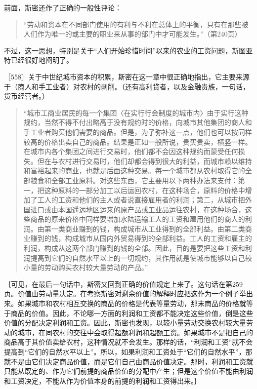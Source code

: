 前面，斯密还作了正确的一般性评论：

\begin{quote}{“劳动和资本在不同部门使用的有利与不利在总体上的平衡，只有在那些被人们作为唯一的或主要的职业来从事的部门中才可能发生。”（第240页）}\end{quote}

不过，这一思想，特别是关于“人们开始珍惜时间”以来的农业的工资问题，斯图亚特已经很好地阐明了。

［558］关于中世纪城市资本的积累，斯密在这一章中很正确地指出，它主要来源于（商人和手工业者）对农村的剥削。（还有高利贷者，以及金融贵族，一句话，货币经营者。）

\begin{quote}{“城市工商业居民的每一个集团〈在实行行会制度的城市内〉由于实行这种规约，当然不得不付出略高于没有规约时的价格，向城市其他集团的商人和手工业者购买他们需要的商品。但是，为了弥补这一点，他们也可以按同样较高的价格出卖自己的商品。结果是正如一般所说，贵买贵卖，横竖一样。在城市内各个集团之间进行交易时，他们都不会因这种规约而蒙受任何损失。但在与农村进行交易时，他们却都会得到很大的利益，而城市赖以维持和富裕起来的商业，也就是后面这种交易。每一个城市都从农村取得它的全部粮食和全部工业原料。对这些东西，它主要用以下两种办法来支付：第一，把这种原料的一部分加工以后运回农村，在这种场合，原料的价格中增加了工人的工资和他们的主人或者说直接雇用者的利润；第二，从城市把外国进口或由本国遥远地区运来的原产品或工业品运往农村，在这种场合，这些商品的原来价格中同样要增加水陆运输工人的工资和雇用他们的商人的利润。由第一类商业赚到的钱，构成城市从工业得到的全部利益。由第二类商业赚到的钱，构成城市从国内外贸易得到的全部利益。工人的工资和雇主的利润，构成从这两个部门赚到的钱的全部。因此，目的是要把这些工资和利润提高到它们的自然水平以上的一切规约，其作用就是使城市能够以自己较小量的劳动购买农村较大量劳动的产品。”}\end{quote}

｛可见，在最后一句话中，斯密又回到正确的价值规定上来了。这句话在第259页。价值由劳动量决定。在考察斯密对剩余价值的解释时应把这作为一个例子举出来。如果城市和农村相互交换的商品的价格是代表等量劳动，那末商品的价格就等于商品的价值。因此，不论哪一方面的利润和工资都不能决定这些价值，倒是这些价值的分配决定利润和工资。因此，斯密也发现，以较小量劳动交换农村较大量劳动的城市，在同农村的交往中会取得超额利润和超额工资。如果城市不是把自己的商品高于其价值卖给农村，这种情况就不会发生。那样的话，“利润和工资”就不会提高到“它们的自然水平以上”。所以，如果利润和工资处于“它们的自然水平”，那就不是由它们决定商品价值，而是它们自己由商品价值决定。那时，利润和工资就只能从既定的、作为它们前提的商品价值的分配中产生；但是这个价值不能由利润和工资决定，不能从作为价值本身的前提的利润和工资得出来。｝

